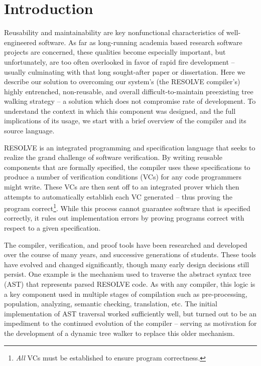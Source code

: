 \documentclass[times]{speauth}
\begin{document}
\section{Introduction}
\vspace{-2pt}
Reusability and maintainability are key nonfunctional characteristics of well-engineered software. As far as long-running academia based research software projects are concerned, these qualities become especially important, but unfortunately, are too often overlooked in favor of rapid fire development -- usually culminating with that long sought-after paper or dissertation. Here we describe our solution to overcoming our system's (the RESOLVE compiler's) highly entrenched, non-reusable, and overall difficult-to-maintain preexisting tree walking strategy -- a solution which does not compromise rate of development. To understand the context in which this component was designed, and the full implications of its usage, we start with a brief overview of the compiler and its source language.

RESOLVE is an integrated programming and specification language that seeks to realize the grand challenge of software verification. By writing reusable components that are formally specified, the compiler uses these specifications to produce a number of verification conditions (VCs) for any code programmers might write. These VCs are then sent off to an integrated prover which then attempts to automatically establish each VC generated -- thus proving the program correct\footnote{\textit{All} VCs must be established to ensure program correctness.}. While this process cannot guarantee software that is specified correctly, it rules out implementation errors by proving programs correct with respect to a given specification.

The compiler, verification, and proof tools have been researched and developed over the course of many years, and successive generations of students. These tools have evolved and changed significantly, though many early design decisions still persist. One example is the mechanism used to traverse the abstract syntax tree (AST) that represents parsed RESOLVE code. As with any compiler, this logic is a key component used in multiple stages of compilation such as pre-processing, population, analyzing, semantic checking, translation, etc. The initial implementation of AST traversal worked sufficiently well, but turned out to be an impediment to the continued evolution of the compiler -- serving as motivation for the development of a dynamic tree walker to replace this older mechanism.
\end{document}
